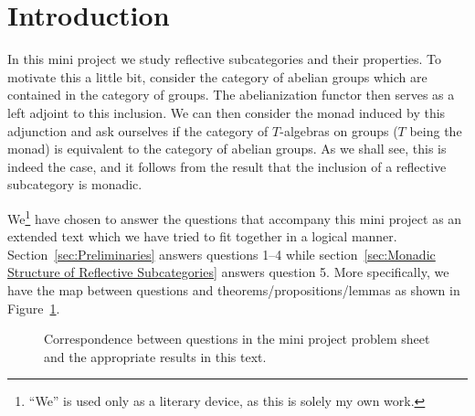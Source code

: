 \section{Introduction} %
\label{sec:Introduction}
In this mini project we study reflective subcategories and their properties. To motivate this a little bit, consider the category of abelian groups which are contained in the category of groups. The abelianization functor then serves as a left adjoint to this inclusion. We can then consider the monad induced by this adjunction and ask ourselves if the category of $ T $-algebras on groups ($ T $ being the monad) is equivalent to the category of abelian groups. As we shall see, this is indeed the case, and it follows from the result that the inclusion of a reflective subcategory is monadic.

We\footnote{``We'' is used only as a literary device, as this is solely my own work.} have chosen to answer the questions that accompany this mini project as an extended text which we have tried to fit together in a logical manner. Section~\ref{sec:Preliminaries} answers questions 1--4 while section~\ref{sec:Monadic Structure of Reflective Subcategories} answers question 5. More specifically, we have the map between questions and theorems/propositions/lemmas as shown in Figure~\ref{fig:map}.
\begin{figure}[ht]
  \begin{center}
  \end{center}
  \caption{Correspondence between questions in the mini project problem sheet and the appropriate results in this text.}\label{fig:map}
\end{figure}

